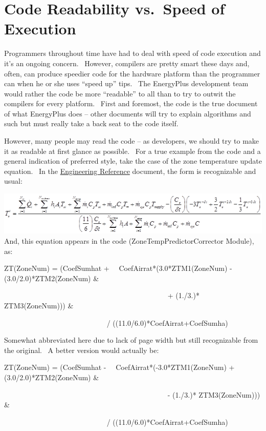 \section{Code Readability vs.~Speed of Execution}\label{code-readability-vs.speed-of-execution}

Programmers throughout time have had to deal with speed of code execution and it's an ongoing concern.~ However, compilers are pretty smart these days and, often, can produce speedier code for the hardware platform than the programmer can when he or she uses ``speed up'' tips.~ The EnergyPlus development team would rather the code be more ``readable'' to all than to try to outwit the compilers for every platform.~ First and foremost, the code is the true document of what EnergyPlus does -- other documents will try to explain algorithms and such but must really take a back seat to the code itself.

However, many people may read the code -- as developers, we should try to make it as readable at first glance as possible.~ For a true example from the code and a general indication of preferred style, take the case of the zone temperature update equation.~ In the \href{file:///E:/Docs4PDFs/EngineeringReference.pdf}{Engineering Reference} document, the form is recognizable and usual:

\includegraphics{media/image001.png}And, this equation appears in the code (ZoneTempPredictorCorrector Module), as:

ZT(ZoneNum) = (CoefSumhat +~~ CoefAirrat*(3.0*ZTM1(ZoneNum) - (3.0/2.0)*ZTM2(ZoneNum) \&

~~~~~~~~~~~~~~~~~~~~~~~~~~~~~~~~~~~~~~~~~~~~~ + (1./3.)* ZTM3(ZoneNum))) \&

~~~~~~~~~~~~~~~~~~~~~~~~~~~~ / ((11.0/6.0)*CoefAirrat+CoefSumha)

Somewhat abbreviated here due to lack of page width but still recognizable from the original.~ A better version would actually be:

ZT(ZoneNum) = (CoefSumhat -~~ CoefAirrat*(-3.0*ZTM1(ZoneNum) + (3.0/2.0)*ZTM2(ZoneNum) \&

~~~~~~~~~~~~~~~~~~~~~~~~~~~~~~~~~~~~~~~~~~~~~ - (1./3.)* ZTM3(ZoneNum))) \&

~~~~~~~~~~~~~~~~~~~~~~~~~~~~ / ((11.0/6.0)*CoefAirrat+CoefSumha)

